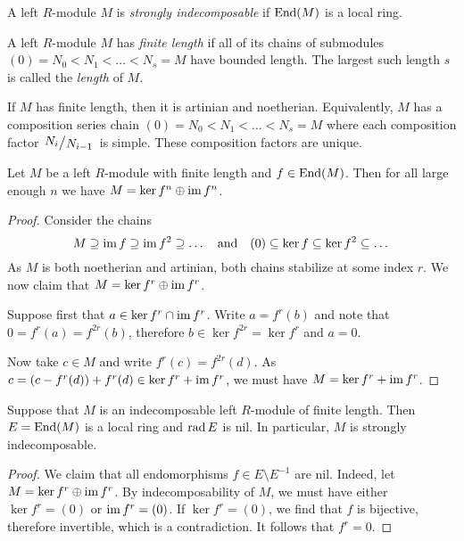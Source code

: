 \begin{definicija}
A left $R$-module $M$ is
\emph{strongly indecomposable} if
$\operatorname{End}(M)$ is a local ring.
\end{definicija}

\begin{definicija}
A left $R$-module $M$ has \emph{finite length}
if all of its chains of submodules
$(0) = N_0 < N_1 < \dots < N_s = M$ have bounded length. The
largest such length $s$ is called the
\emph{length} of $M$.
\end{definicija}

\begin{opomba}
If $M$ has finite length, then it is artinian and noetherian.
Equivalently, $M$ has a composition series chain
$(0) = N_0 < N_1 < \dots < N_s = M$ where each composition factor
$\kvoc{N_i}{N_{i-1}}$ is simple. These composition factors are
unique.
\end{opomba}

\begin{izrek}
Let $M$ be a left $R$-module with finite length and
$f \in \operatorname{End}(M)$. Then for all large enough $n$ we have
$M = \ker f^n \oplus \operatorname{im} f^n$.
\end{izrek}

\begin{proof}
Consider the chains
\[
M \supseteq \operatorname{im} f \supseteq \operatorname{im} f^2 \supseteq \dots
\quad \text{and} \quad
(0) \subseteq \ker f \subseteq \ker f^2 \subseteq \dots
\]
As $M$ is both noetherian and artinian, both chains stabilize at
some index $r$. We now claim that $M = \ker f^r \oplus \operatorname{im} f^r$.

Suppose first that $a \in \ker f^r \cap \operatorname{im} f^r$. Write
$a = f^r(b)$ and note that $0 = f^r(a) = f^{2r}(b)$, therefore
$b \in \ker f^{2r} = \ker f^r$ and $a = 0$.

Now take $c \in M$ and write $f^r(c) = f^{2r}(d)$. As
$c = \left(c - f^r(d)\right) + f^r(d) \in \ker f^r + \operatorname{im} f^r$, we must have
$M = \ker f^r + \operatorname{im} f^r$.
\end{proof}

\begin{izrek}
Suppose that $M$ is an indecomposable left $R$-module of finite
length. Then $E = \operatorname{End}(M)$ is a local ring and $\operatorname{rad} E$ is nil. In
particular, $M$ is strongly indecomposable.
\end{izrek}

\begin{proof}
We claim that all endomorphisms $f \in E \setminus E^{-1}$ are nil.
Indeed, let $M = \ker f^r \oplus \operatorname{im} f^r$. By indecomposability of
$M$, we must have either $\ker f^r = (0)$ or $\operatorname{im} f^r = (0)$. If
$\ker f^r = (0)$, we find that $f$ is bijective, therefore
invertible, which is a contradiction. It follows that $f^r = 0$.
\end{proof}

